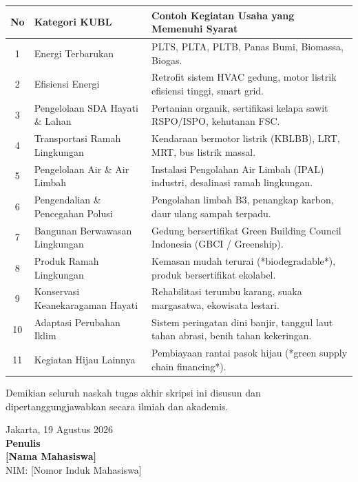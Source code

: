 \documentclass[12pt,a4paper]{article}
\newcommand{\nahamahasiswa}{[Nama Mahasiswa]}
\newcommand{\nim}{[Nomor Induk Mahasiswa]}
\numberwithin{equation}{section}
\begin{document}
\vspace{0.3cm}
\begin{table}[H]
  \small
  \begin{tabularx}{\textwidth}{|c|>{\raggedright\arraybackslash}p{3.8cm}|X|}
    \hline
    \textbf{No} & \textbf{Kategori KUBL} & \textbf{Contoh Kegiatan Usaha yang Memenuhi Syarat} \\
    \hline
    1 & Energi Terbarukan & PLTS, PLTA, PLTB, Panas Bumi, Biomassa, Biogas. \\
    2 & Efisiensi Energi & Retrofit sistem HVAC gedung, motor listrik efisiensi tinggi, smart grid. \\
    3 & Pengelolaan SDA Hayati \& Lahan & Pertanian organik, sertifikasi kelapa sawit RSPO/ISPO, kehutanan FSC. \\
    4 & Transportasi Ramah Lingkungan & Kendaraan bermotor listrik (KBLBB), LRT, MRT, bus listrik massal. \\
    5 & Pengelolaan Air \& Air Limbah & Instalasi Pengolahan Air Limbah (IPAL) industri, desalinasi ramah lingkungan. \\
    6 & Pengendalian \& Pencegahan Polusi & Pengolahan limbah B3, penangkap karbon, daur ulang sampah terpadu. \\
    7 & Bangunan Berwawasan Lingkungan & Gedung bersertifikat Green Building Council Indonesia (GBCI / Greenship). \\
    8 & Produk Ramah Lingkungan & Kemasan mudah terurai (*biodegradable*), produk bersertifikat ekolabel. \\
    9 & Konservasi Keanekaragaman Hayati & Rehabilitasi terumbu karang, suaka margasatwa, ekowisata lestari. \\
    10 & Adaptasi Perubahan Iklim & Sistem peringatan dini banjir, tanggul laut tahan abrasi, benih tahan kekeringan. \\
    11 & Kegiatan Hijau Lainnya & Pembiayaan rantai pasok hijau (*green supply chain financing*). \\
    \hline
  \end{tabularx}
\end{table}

\vspace{0.5cm}
\noindent
Demikian seluruh naskah tugas akhir skripsi ini disusun dan dipertanggungjawabkan secara ilmiah dan akademis.

\vspace{0.8cm}
\begin{flushright}
  Jakarta, 19 Agustus 2026\\[0.3cm]
  \textbf{Penulis}\\[1.8cm]
  \textbf{\nahamahasiswa}\\
  NIM: \nim
\end{flushright}
\end{document}
